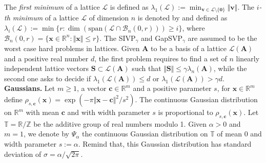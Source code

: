 \documentclass[a4paper,11pt,onecolumn]{elsarticle}
\begin{document}
	The \textit{first minimum} of a lattice $\mathcal{L}$ is defined as      $\lambda_1(\mathcal{L}):=\min_{\mathbf{v} \in \mathcal{L} \setminus \{\textbf{0}\}}\Vert \mathbf{v}\Vert$. The \textit{$i$-th minimum} of a lattice $\mathcal{L}$ of dimension $n$ is denoted by and defined as      $\lambda_i(\mathcal{L}):=\min\{r: \dim(\text{span}(\mathcal{L} \cap \mathcal{B}_n(0,r))) \geq i\}$, where $\mathcal{B}_n(0,r)=\{\mathbf{x} \in \mathbb{R}^n: \Vert \mathbf{x}\Vert \leq r \}$.    The \textsf{SIVP}$_\gamma$ and \textsf{GapSVP}$_\gamma$  are assumed to be the worst case hard problems in lattices. Given $\mathbf{A}$ to be a basis of a lattice $ \mathcal{L}(\mathbf{A})$ and a positive real number $d$, the first problem requires to find a set of $n$ linearly independent lattice vectors $\mathbf{S} \subset \mathcal{L}(\mathbf{A})$ such that $\Vert  \mathbf{S} \Vert \leq \gamma \lambda_n(\mathbf{A})$, while
	the second one asks to decide if $\lambda_1(\mathcal{L}(\mathbf{A}))\leq d$ or $\lambda_1(\mathcal{L}(\mathbf{A}))>\gamma d$.\\
	

	\noindent  \textbf{Gaussians.}  Let $m\geq 1$, a vector $\mathbf{c}\in \mathbb{R}^m$ and a positive parameter $s$, for $\mathbf{x}\in \mathbb{R}^m$ define $\rho_{s,\mathbf{c}}(\mathbf{x})= \exp({{-\pi \Vert \mathbf{x}-\mathbf{c}\Vert^2 }/{ s^2}})$. 
	The continuous Gaussian distribution on $\mathbb{R}^m$ with mean $\textbf{c}$ and with width parameter $s$ is proportional to $\rho_{s,\mathbf{c}}(\mathbf{x})$.  
	Let $\mathbb{T}=\mathbb{R}/\mathbb{Z}$ be the additive group of real numbers modulo 1. Given $\alpha>0$ and $m=1$,   we denote by $\Psi_{\alpha}$ the continuous Gaussian distribution on  $\mathbb{T}$ of mean $0$ and width parameter $s:=\alpha$. Remind that, this Gaussian distribution has standard deviation of $\sigma=\alpha/\sqrt{2\pi}$.
	
	
\end{document}
